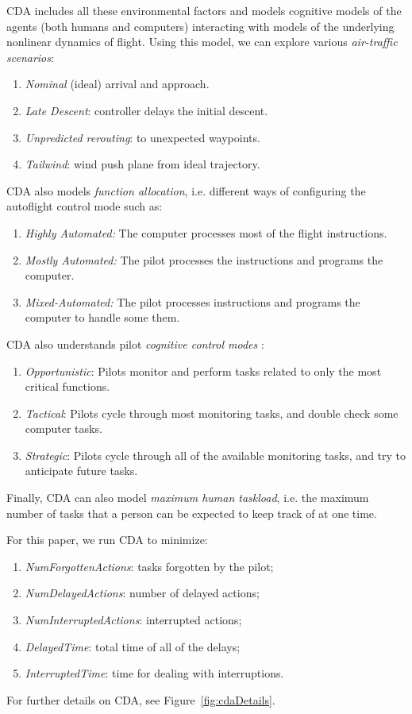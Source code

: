 \documentclass[10pt,journal,compsoc]{IEEEtran}
\newcommand{\be}{\begin{enumerate}}
\newcommand{\ee}{\end{enumerate}}
\newcommand{\fig}[1]{Figure~\ref{fig:#1}}
\begin{document}
CDA includes all these environmental factors and
models cognitive models of the agents (both humans and computers) interacting with models of the underlying nonlinear dynamics of flight.  
Using this model,
we can explore various
{\em air-traffic scenarios}:
    \be
    \item{\em Nominal} (ideal) arrival and approach.
    \item{\em Late Descent}: controller delays the initial descent.
    \item{\em Unpredicted rerouting}:  to  unexpected waypoints.
    \item{\em Tailwind}: wind  push  plane from  ideal trajectory.
    \ee
CDA also models
{\em function allocation},
i.e. different ways of configuring the autoflight control mode such as:
    \be
    \item{\em Highly Automated:} The computer processes most of the flight instructions.
    \item{\em Mostly Automated:} The pilot processes the instructions and programs the computer.
    \item{\em Mixed-Automated:} The pilot processes instructions and programs the computer to handle some them.
    \ee
CDA also understands pilot {\em 
 cognitive control modes} : 
    \be
    \item{\em Opportunistic}:  Pilots monitor and perform tasks related to only the most critical functions.
    \item{\em Tactical}: Pilots cycle through most monitoring tasks, and double check some computer tasks.
    \item{\em Strategic}: Pilots cycle through all of the available monitoring tasks, and try to anticipate future tasks.
    \ee
Finally, CDA can also model
\emph{maximum human taskload}, i.e. the maximum number of tasks that a person can be expected to keep track of at one time.






For this paper, we run CDA to  minimize:
\be
\item
\emph{NumForgottenActions}:
tasks forgotten by the pilot;
\item
{\em NumDelayedActions}: number of delayed actions;
\item
 \emph{NumInterruptedActions}: 
interrupted actions;
\item 
\emph{DelayedTime}:
total time of all of the delays;
\item 
{\em InterruptedTime}: time for
dealing with interruptions.
\ee
For further details on CDA, see \fig{cdaDetails}.
\end{document}
